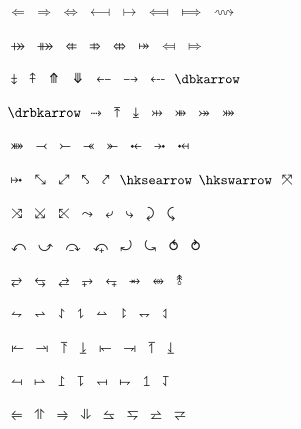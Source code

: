 \documentclass{article}
\begin{document}
$\Longleftarrow$ $\Longrightarrow$ $\Longleftrightarrow$ $\longmapsfrom$ $\longmapsto$ $\Longmapsfrom$ $\Longmapsto$ $\longrightsquigarrow$ \par
$\nvtwoheadrightarrow$ $\nVtwoheadrightarrow$ $\nvLeftarrow$ $\nvRightarrow$ $\nvLeftrightarrow$ $\twoheadmapsto$ $\Mapsfrom$ $\Mapsto$ \par
$\downarrowbarred$ $\uparrowbarred$ $\Uuparrow$ $\Ddownarrow$ $\leftbkarrow$ $\rightbkarrow$ $\leftdbkarrow$ $\dbkarrow$ \par
$\drbkarrow$ $\rightdotarrow$ $\baruparrow$ $\downarrowbar$ $\nvrightarrowtail$ $\nVrightarrowtail$ $\twoheadrightarrowtail$ $\nvtwoheadrightarrowtail$ \par
$\nVtwoheadrightarrowtail$ $\lefttail$ $\righttail$ $\leftdbltail$ $\rightdbltail$ $\diamondleftarrow$ $\rightarrowdiamond$ $\diamondleftarrowbar$ \par
$\barrightarrowdiamond$ $\nwsearrow$ $\neswarrow$ $\hknwarrow$ $\hknearrow$ $\hksearrow$ $\hkswarrow$ $\tona$ \par
$\toea$ $\tosa$ $\towa$ $\rightcurvedarrow$ $\leftdowncurvedarrow$ $\rightdowncurvedarrow$ $\cwrightarcarrow$ $\acwleftarcarrow$ \par
$\acwoverarcarrow$ $\acwunderarcarrow$ $\curvearrowrightminus$ $\curvearrowleftplus$ $\cwundercurvearrow$ $\ccwundercurvearrow$ $\acwcirclearrow$ $\cwcirclearrow$ \par
$\rightarrowshortleftarrow$ $\leftarrowshortrightarrow$ $\shortrightarrowleftarrow$ $\rightarrowplus$ $\leftarrowplus$ $\rightarrowx$ $\leftrightarrowcircle$ $\twoheaduparrowcircle$ \par
$\leftrightharpoonupdown$ $\leftrightharpoondownup$ $\updownharpoonrightleft$ $\updownharpoonleftright$ $\leftrightharpoonupup$ $\updownharpoonrightright$ $\leftrightharpoondowndown$ $\updownharpoonleftleft$ \par
$\barleftharpoonup$ $\rightharpoonupbar$ $\barupharpoonright$ $\downharpoonrightbar$ $\barleftharpoondown$ $\rightharpoondownbar$ $\barupharpoonleft$ $\downharpoonleftbar$ \par
$\leftharpoonupbar$ $\barrightharpoonup$ $\upharpoonrightbar$ $\bardownharpoonright$ $\leftharpoondownbar$ $\barrightharpoondown$ $\upharpoonleftbar$ $\bardownharpoonleft$ \par
$\leftharpoonsupdown$ $\upharpoonsleftright$ $\rightharpoonsupdown$ $\downharpoonsleftright$ $\leftrightharpoonsup$ $\leftrightharpoonsdown$ $\rightleftharpoonsup$ $\rightleftharpoonsdown$ \par
\end{document}
